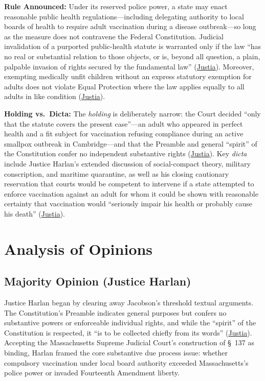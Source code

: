 \documentclass[12pt]{article}
\begin{document}
\textbf{Rule Announced:} Under its reserved police power, a state may enact reasonable public health regulations---including delegating authority to local boards of health to require adult vaccination during a disease outbreak---so long as the measure does not contravene the Federal Constitution. Judicial invalidation of a purported public-health statute is warranted only if the law ``has no real or substantial relation to those objects, or is, beyond all question, a plain, palpable invasion of rights secured by the fundamental law'' (\href{https://supreme.justia.com/cases/federal/us/197/11/}{Justia}). Moreover, exempting medically unfit children without an express statutory exemption for adults does not violate Equal Protection where the law applies equally to all adults in like condition (\href{https://supreme.justia.com/cases/federal/us/197/11/}{Justia}).

\textbf{Holding vs.\ Dicta:} The \emph{holding} is deliberately narrow: the Court decided ``only that the statute covers the present case''---an adult who appeared in perfect health and a fit subject for vaccination refusing compliance during an active smallpox outbreak in Cambridge---and that the Preamble and general ``spirit'' of the Constitution confer no independent substantive rights (\href{https://supreme.justia.com/cases/federal/us/197/11/}{Justia}). Key \emph{dicta} include Justice Harlan's extended discussion of social-compact theory, military conscription, and maritime quarantine, as well as his closing cautionary reservation that courts would be competent to intervene if a state attempted to enforce vaccination against an adult for whom it could be shown with reasonable certainty that vaccination would ``seriously impair his health or probably cause his death'' (\href{https://supreme.justia.com/cases/federal/us/197/11/}{Justia}).

\section{Analysis of Opinions}

\subsection{Majority Opinion (Justice Harlan)}

Justice Harlan began by clearing away Jacobson's threshold textual arguments. The Constitution's Preamble indicates general purposes but confers no substantive powers or enforceable individual rights, and while the ``spirit'' of the Constitution is respected, it ``is to be collected chiefly from its words'' (\href{https://supreme.justia.com/cases/federal/us/197/11/}{Justia}). Accepting the Massachusetts Supreme Judicial Court's construction of \S~137 as binding, Harlan framed the core substantive due process issue: whether compulsory vaccination under local board authority exceeded Massachusetts's police power or invaded Fourteenth Amendment liberty.
\end{document}
